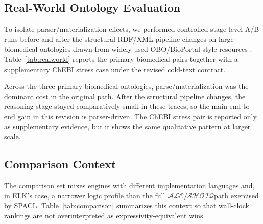 \documentclass[preprint,12pt,times]{elsarticle}
\newcommand{\dlfrag}{\ensuremath{\mathcal{ALC/SHOIQ}}}
\begin{document}
\subsection{Real-World Ontology Evaluation}
\label{sec:realworld}

To isolate parser/materialization effects, we performed controlled stage-level A/B runs before and after the structural RDF/XML pipeline changes on large biomedical ontologies drawn from widely used OBO/BioPortal-style resources \cite{bioportal}. Table~\ref{tab:realworld} reports the primary biomedical pairs together with a supplementary ChEBI stress case under the revised cold-text contract.

\begin{table}[htbp]
\centering
\caption{Stage-Level A/B on Real-World RDF/XML Ontologies (cold \texttt{.owl} runs; E2E = end-to-end wall clock; ChEBI is supplementary)}
\label{tab:realworld}
\end{table}

Across the three primary biomedical ontologies, parse/materialization was the dominant cost in the original path. After the structural pipeline changes, the reasoning stage stayed comparatively small in these traces, so the main end-to-end gain in this revision is parser-driven. The ChEBI stress pair is reported only as supplementary evidence, but it shows the same qualitative pattern at larger scale.

\subsection{Comparison Context}
\label{sec:comparison}

The comparison set mixes engines with different implementation languages and, in ELK's case, a narrower logic profile than the full \dlfrag path exercised by SPACL. Table~\ref{tab:comparison} summarizes this context so that wall-clock rankings are not overinterpreted as expressivity-equivalent wins.
\end{document}
